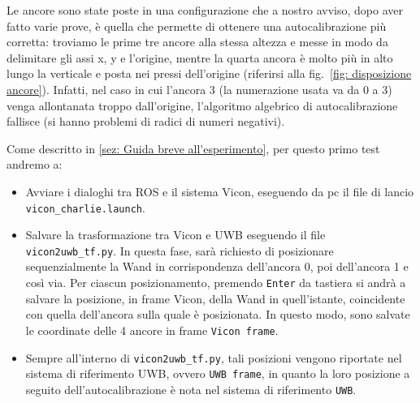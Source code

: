 
Le ancore sono state poste in una configurazione che a nostro avviso, dopo aver fatto varie prove, è quella che permette di ottenere una autocalibrazione più corretta: troviamo le prime tre ancore alla stessa altezza e messe in modo da delimitare gli assi x, y e l'origine, mentre la quarta ancora è molto pi\`u in alto lungo la verticale e posta nei pressi dell'origine (riferirsi alla fig.~\ref{fig: disposizione ancore}).
Infatti, nel caso in cui l'ancora 3 (la numerazione usata va da 0 a 3) venga allontanata troppo dall'origine, l'algoritmo algebrico di autocalibrazione fallisce (si hanno problemi di radici di numeri negativi).

Come descritto in \ref{sez: Guida breve all'esperimento}, per questo primo test andremo a:
\begin{itemize}
	\item Avviare i dialoghi tra ROS e il sistema Vicon, eseguendo da pc il file di lancio \verb|vicon_charlie.launch|.
	
	\item Salvare la trasformazione tra Vicon e UWB eseguendo il file \verb|vicon2uwb_tf.py|. In questa fase, sarà richiesto di posizionare sequenzialmente la Wand in corrispondenza dell'ancora 0, poi dell'ancora 1 e così via. 
	Per ciascun posizionamento, premendo \verb|Enter| da tastiera si andrà a salvare la posizione, in frame Vicon, della Wand in quell'istante, coincidente con quella dell'ancora sulla quale è posizionata. In questo modo, sono salvate le coordinate delle 4 ancore in frame \verb|Vicon frame|.
	
	\item Sempre all'interno di \verb|vicon2uwb_tf.py|, tali posizioni vengono riportate nel sistema di riferimento UWB, ovvero \verb|UWB frame|, 
	in quanto la loro posizione a seguito dell'autocalibrazione è nota nel sistema di riferimento \verb|UWB|.
\end{itemize}

